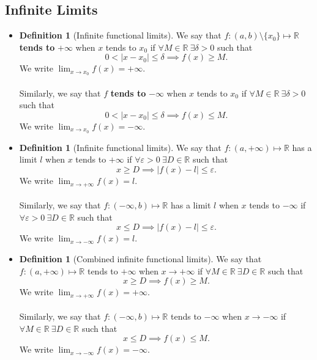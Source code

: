 \documentclass{article}
\newcommand{\R}{\mathbb{R}}
\newcommand{\?}{\stackrel{?}{=}}
\theoremstyle{definition} %
\newtheorem{definition}[theorem]{Definition} %
\begin{document}
\subsection{Infinite Limits}

\begin{itemize}
    \item[]
          \begin{definition}[Infinite functional limits]
              We say that $f: (a, b) \setminus \{x_0\} \mapsto \R$ \textbf{tends to} $+\infty$ when $x$ tends to $x_0$ if $\forall M \in \R \ \exists \delta > 0$ such that
              $$0 < |x - x_0| \leq \delta \implies f(x) \geq M.$$
              We write $\lim_{x \to x_0} f(x) = +\infty$. \\\\
              Similarly, we say that $f$ \textbf{tends to } $-\infty$ when $x$ tends to $x_0$ if $\forall M \in \R \ \exists \delta > 0$ such that
              $$0 < |x - x_0| \leq \delta \implies f(x) \leq M.$$
              We write $\lim_{x \to x_0} f(x) = -\infty$.
          \end{definition}
    \item[]
          \begin{definition}[Infinite functional limits]
              We say that $f: (a, +\infty) \mapsto \R$ has a limit $l$ when $x$ tends to $+\infty$ if $\forall \varepsilon > 0 \ \exists D \in \R$ such that
              $$x \geq D \implies |f(x) - l| \leq \varepsilon.$$
              We write $\lim_{x \to +\infty} f(x) = l$. \\\\
              Similarly, we say that $f: (-\infty, b) \mapsto \R$ has a limit $l$ when $x$ tends to $-\infty$ if $\forall \varepsilon > 0 \ \exists D \in \R$ such that
              $$x \leq D \implies |f(x) - l| \leq \varepsilon.$$
              We write $\lim_{x \to -\infty} f(x) = l$.
          \end{definition}
    \item[]
          \begin{definition}[Combined infinite functional limits]
              We say that $f: (a, +\infty) \mapsto \R$ tends to $+\infty$ when $x \rightarrow +\infty$ if $\forall M \in \R \ \exists D \in \R$ such that
              $$x \geq D \implies f(x) \geq M.$$
              We write $\lim_{x \to +\infty} f(x) = +\infty$. \\\\
              Similarly, we say that $f: (-\infty, b) \mapsto \R$ tends to $-\infty$ when $x \rightarrow -\infty$ if $\forall M \in \R \ \exists D \in \R$ such that
              $$x \leq D \implies f(x) \leq M.$$
              We write $\lim_{x \to -\infty} f(x) = -\infty$.
          \end{definition}
\end{itemize}
\end{document}

